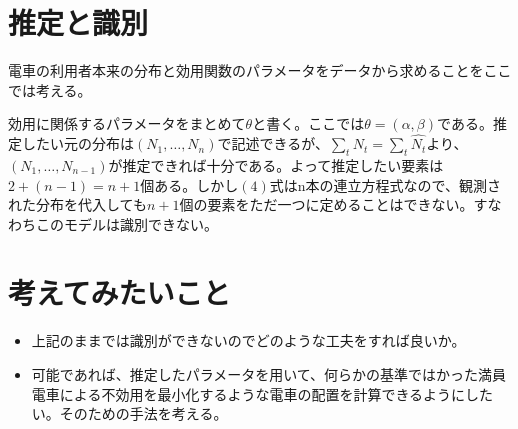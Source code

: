 \documentclass{jsarticle}
\begin{document}
\section{推定と識別}
電車の利用者本来の分布と効用関数のパラメータをデータから求めることをここでは考える。

効用に関係するパラメータをまとめて$\theta$と書く。ここでは$\theta = (\alpha, \beta)$である。推定したい元の分布は$(N_1, \dots, N_n)$で記述できるが、$\sum_t N_t = \sum_t \hat{N_t}$より、$(N_1, \dots, N_{n-1})$が推定できれば十分である。よって推定したい要素は$2 + (n-1) = n+1$個ある。しかし$(4)$式はn本の連立方程式なので、観測された分布を代入しても$n+1$個の要素をただ一つに定めることはできない。すなわちこのモデルは識別できない。

\section{考えてみたいこと}
\begin{itemize}
	\item 上記のままでは識別ができないのでどのような工夫をすれば良いか。
	\item 可能であれば、推定したパラメータを用いて、何らかの基準ではかった満員電車による不効用を最小化するような電車の配置を計算できるようにしたい。そのための手法を考える。
\end{itemize}
\end{document}
